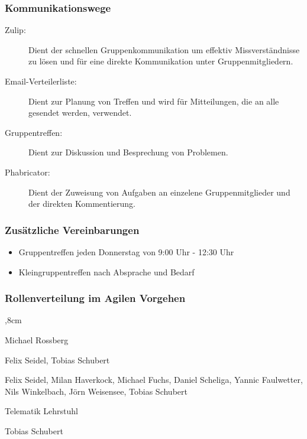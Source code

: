 \subsubsection{Kommunikationswege}
\begin{description}
	\item[Zulip:] Dient der schnellen Gruppenkommunikation um effektiv Missverständnisse zu lösen und für eine direkte Kommunikation unter Gruppenmitgliedern.
	
	\item[Email-Verteilerliste:] Dient zur Planung von Treffen und wird für Mitteilungen, die an alle gesendet werden, verwendet.
	
	\item[Gruppentreffen:] Dient zur Diskussion und Besprechung von Problemen. 
	
	\item[Phabricator:] Dient der Zuweisung von Aufgaben an einzelene Gruppenmitglieder und der direkten Kommentierung.
	
\end{description}

\subsubsection{Zusätzliche Vereinbarungen}
\begin{itemize}
	\item Gruppentreffen jeden Donnerstag von 9:00 Uhr - 12:30 Uhr
	
	\item Kleingruppentreffen nach Absprache und Bedarf
	
\end{itemize}

\subsubsection{Rollenverteilung im Agilen Vorgehen}

\begin{description}
	,8cm
	\item[Produkt Owner:] Michael Rossberg
	
	\item[Scrum Master:] Felix Seidel, Tobias Schubert
	
	\item[Entwicklungsteam:] Felix Seidel, Milan Haverkock, Michael Fuchs, Daniel Scheliga, Yannic Faulwetter, Nils Winkelbach, Jörn Weisensee, Tobias Schubert
	
	\item[Kunde, Anwender:] Telematik Lehrstuhl
	
	\item[Management:] Tobias Schubert
\end{description}

